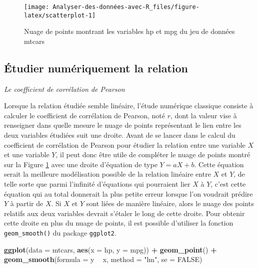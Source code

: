 \documentclass[
  french,
]{book}
\newenvironment{Shaded}{\begin{snugshade}}{\end{snugshade}}
\newcommand{\DataTypeTok}[1]{\textcolor[rgb]{0.13,0.29,0.53}{#1}}
\newcommand{\KeywordTok}[1]{\textcolor[rgb]{0.13,0.29,0.53}{\textbf{#1}}}
\newcommand{\NormalTok}[1]{#1}
\newcommand{\OperatorTok}[1]{\textcolor[rgb]{0.81,0.36,0.00}{\textbf{#1}}}
\newcommand{\OtherTok}[1]{\textcolor[rgb]{0.56,0.35,0.01}{#1}}
\newcommand{\StringTok}[1]{\textcolor[rgb]{0.31,0.60,0.02}{#1}}
\begin{document}
\begin{figure}

{\centering \texttt{[image: Analyser-des-données-avec-R\_files/figure-latex/scatterplot-1]} 

}

\caption{Nuage de points montrant les variables hp et mpg du jeu de données mtcars}\label{fig:scatterplot}
\end{figure}

\hypertarget{uxe9tudier-numuxe9riquement-la-relation}{%
\subsection{Étudier numériquement la relation}\label{uxe9tudier-numuxe9riquement-la-relation}}

\emph{Le coefficient de corrélation de Pearson}

Lorsque la relation étudiée semble linéaire, l'étude numérique classique consiste à calculer le coefficient de corrélation de Pearson, noté \(r\), dont la valeur vise à renseigner dans quelle mesure le nuage de points représentant le lien entre les deux variables étudiées suit une droite. Avant de se lancer dans le calcul du coefficient de corrélation de Pearson pour étudier la relation entre une variable \(X\) et une variable \(Y\), il peut donc être utile de compléter le nuage de points montré sur la Figure \ref{fig:scatterplot} avec une droite d'équation de type \(Y = aX + b\). Cette équation serait la meilleure modélisation possible de la relation linéaire entre \(X\) et \(Y\), de telle sorte que parmi l'infinité d'équations qui pourraient lier \(X\) à \(Y\), c'est cette équation qui au total donnerait la plus petite erreur lorsque l'on voudrait prédire \(Y\) à partir de \(X\). Si \(X\) et \(Y\) sont liées de manière linéaire, alors le nuage des points relatifs aux deux variables devrait s'étaler le long de cette droite. Pour obtenir cette droite en plus du nuage de points, il est possible d'utiliser la fonction \texttt{geom\_smooth()} du package \texttt{ggplot2}.

\begin{Shaded}
\begin{Highlighting}[]
\KeywordTok{ggplot}\NormalTok{(}\DataTypeTok{data =}\NormalTok{ mtcars, }\KeywordTok{aes}\NormalTok{(}\DataTypeTok{x =}\NormalTok{ hp, }\DataTypeTok{y =}\NormalTok{ mpg)) }\OperatorTok{+}\StringTok{ }
\StringTok{  }\KeywordTok{geom_point}\NormalTok{() }\OperatorTok{+}
\StringTok{  }\KeywordTok{geom_smooth}\NormalTok{(}\DataTypeTok{formula =}\NormalTok{ y }\OperatorTok{~}\StringTok{ }\NormalTok{x, }\DataTypeTok{method =} \StringTok{"lm"}\NormalTok{, }\DataTypeTok{se =} \OtherTok{FALSE}\NormalTok{)}
\end{Highlighting}
\end{Shaded}
\end{document}
